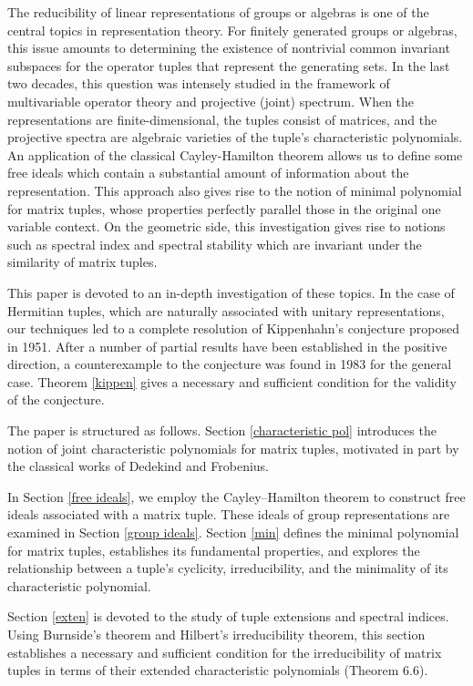 \documentclass[draft, 12pt, reqno]{amsart}
\numberwithin{equation}{section}
\theoremstyle{plain}
\begin{document}
The reducibility of linear representations of groups or algebras is one of the central topics in representation theory. For finitely generated groups or algebras, this issue amounts to determining the existence of nontrivial common invariant subspaces for the operator tuples that represent the generating sets. In the last two decades, this question was intensely studied in the framework of multivariable operator theory and projective (joint) spectrum. When the representations are finite-dimensional, the tuples consist of matrices, and the projective spectra are algebraic varieties of the tuple's characteristic polynomials. An application of the classical Cayley-Hamilton theorem allows us to define some free ideals which contain a substantial amount of information about the representation. This approach also gives rise to the notion of minimal polynomial for matrix tuples, whose properties perfectly parallel those in the original one variable context. On the geometric side, this investigation gives rise to notions such as spectral index and spectral stability which are invariant under the similarity of matrix tuples.

This paper is devoted to an in-depth investigation of these topics. In the case of Hermitian tuples, which are naturally associated with unitary representations, our techniques led to a complete resolution of Kippenhahn's conjecture proposed in 1951. After a number of partial results have been established in the positive direction, a counterexample to the conjecture was found in 1983 for the general case. Theorem \ref{kippen} gives a necessary and sufficient condition for the validity of the conjecture.

The paper is structured as follows. Section \ref{characteristic pol} introduces the notion of joint characteristic polynomials for matrix tuples, motivated in part by the classical works of Dedekind and Frobenius. 

In Section \ref{free ideals}, we employ the Cayley–Hamilton theorem to construct free ideals associated with a matrix tuple. These ideals of group representations are examined in Section \ref{group ideals}. Section \ref{min} defines the minimal polynomial for matrix tuples, establishes its fundamental properties, and explores the relationship between a tuple's cyclicity, irreducibility, and the minimality of its characteristic polynomial. 

Section \ref{exten} is devoted to the study of tuple extensions and spectral indices. Using Burnside's theorem and Hilbert’s irreducibility theorem, this section establishes a necessary and sufficient condition for the irreducibility of matrix tuples in terms of their extended characteristic polynomials (Theorem 6.6).
\end{document}
